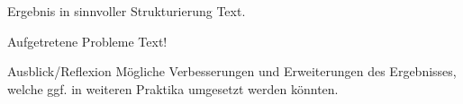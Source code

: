 \documentclass{beamer}
\begin{document}
\begin{frame}[fragile,t]{Ergebnis in sinnvoller Strukturierung}
Text.
\end{frame}

\begin{frame}[fragile,t]{Aufgetretene Probleme}
Text!
\end{frame}

\begin{frame}[fragile,t]{Ausblick/Reflexion}
Mögliche Verbesserungen und Erweiterungen des Ergebnisses, welche ggf. in weiteren Praktika umgesetzt werden könnten.
\end{frame}


\end{document}
